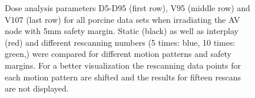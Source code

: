\documentclass[type=dr, dr=rernat, accentcolor=tud7b,colorbacktitle, bigchapter, openright, twoside, 12pt ]{tudthesis}
\begin{document}
\begin{figure}[H]
{}
\caption{Dose analysis parameters D5-D95 (first row), V95 (middle row) and V107 (last row) for all porcine data sets when irradiating the AV 
node with 5mm safety margin. Static (black) as well as interplay (red) and different rescanning numbers (5 times: blue, 10 times: green,) were 
compared for different motion patterns and safety margins. For a better visualization the rescanning data points for each motion pattern are 
shifted and the results for fifteen rescans are not displayed.}
\label{static_interplay_rescanning_ALLpigs}
\end{figure}

\newpage

\begin{figure}[H]
\centering
{}
\end{figure}
\end{document}

